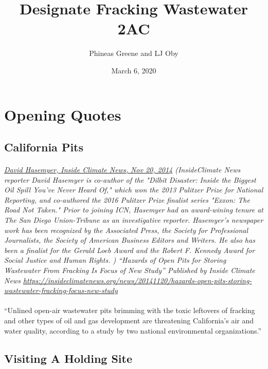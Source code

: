 \documentclass{article}
\title{Designate Fracking Wastewater 2AC}
\date{March 6, 2020}
\author{Phineas Greene and LJ Oby}
\begin{document}
\maketitle
\newpage

\tableofcontents
\newpage

\section{Opening Quotes}

\subsection{California Pits}
\paragraph{}
\small
\textit{
\underline{David Hasemyer, Inside Climate News, Nov 20, 2014}
  (InsideClimate News reporter David Hasemyer is co-author of the "Dilbit Disaster: Inside the Biggest Oil Spill You've Never Heard Of," which won the 2013 Pulitzer Prize for National Reporting, and co-authored the 2016 Pulitzer Prize finalist series "Exxon: The Road Not Taken." Prior to joining ICN, Hasemyer had an award-wining tenure at The San Diego Union-Tribune as an investigative reporter. Hasemyer's newspaper work has been recognized by the Associated Press, the Society for Professional Journalists, the Society of American Business Editors and Writers. He also has been a finalist for the Gerald Loeb Award and the Robert F. Kennedy Award for Social Justice and Human Rights. ) “Hazards of Open Pits for Storing Wastewater From Fracking Is Focus of New Study” Published by Inside Climate News
\url{https://insideclimatenews.org/news/20141120/hazards-open-pits-storing-wastewater-fracking-focus-new-study }}
\normalsize
\paragraph{}
``Unlined open-air wastewater pits brimming with the toxic leftovers of fracking and other types of oil and gas development are threatening California's air and water quality, according to a study by two national environmental organizations.''


\subsection{Visiting A Holding Site}
\end{document}
